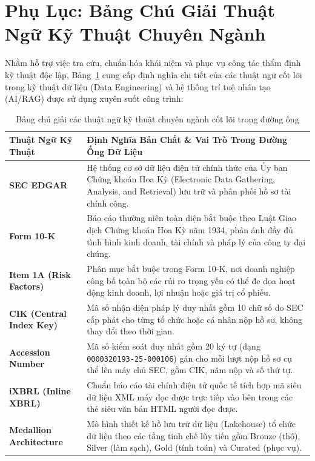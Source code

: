 \section*{Phụ Lục: Bảng Chú Giải Thuật Ngữ Kỹ Thuật Chuyên Ngành}

Nhằm hỗ trợ việc tra cứu, chuẩn hóa khái niệm và phục vụ công tác thẩm định kỹ thuật độc lập, Bảng~\ref{tab:glossary_technical_terms} cung cấp định nghĩa chi tiết của các thuật ngữ cốt lõi trong kỹ thuật dữ liệu (Data Engineering) và hệ thống trí tuệ nhân tạo (AI/RAG) được sử dụng xuyên suốt công trình:

\begin{table}[htbp]
\centering
\scriptsize
\setlength{\tabcolsep}{3pt}
\caption{Bảng chú giải các thuật ngữ kỹ thuật chuyên ngành cốt lõi trong đường ống}
\label{tab:glossary_technical_terms}
\begin{tabularx}{\textwidth}{p{3.8cm} X}
\toprule
\textbf{Thuật Ngữ Kỹ Thuật} & \textbf{Định Nghĩa Bản Chất \& Vai Trò Trong Đường Ống Dữ Liệu} \\
\midrule
\textbf{SEC EDGAR} & Hệ thống cơ sở dữ liệu điện tử chính thức của Ủy ban Chứng khoán Hoa Kỳ (Electronic Data Gathering, Analysis, and Retrieval) lưu trữ và phân phối hồ sơ tài chính công. \\
\textbf{Form 10-K} & Báo cáo thường niên toàn diện bắt buộc theo Luật Giao dịch Chứng khoán Hoa Kỳ năm 1934, phản ánh đầy đủ tình hình kinh doanh, tài chính và pháp lý của công ty đại chúng. \\
\textbf{Item 1A (Risk Factors)} & Phân mục bắt buộc trong Form 10-K, nơi doanh nghiệp công bố toàn bộ các rủi ro trọng yếu có thể đe dọa hoạt động kinh doanh, lợi nhuận hoặc giá trị cổ phiếu. \\
\textbf{CIK (Central Index Key)} & Mã số nhận diện pháp lý duy nhất gồm 10 chữ số do SEC cấp phát cho từng tổ chức hoặc cá nhân nộp hồ sơ, không thay đổi theo thời gian. \\
\textbf{Accession Number} & Mã số kiểm soát duy nhất gồm 20 ký tự (dạng \texttt{0000320193-25-000106}) gán cho mỗi lượt nộp hồ sơ cụ thể lên máy chủ SEC, gồm CIK, năm nộp và số thứ tự. \\
\textbf{iXBRL (Inline XBRL)} & Chuẩn báo cáo tài chính điện tử quốc tế tích hợp mã siêu dữ liệu XML máy đọc được trực tiếp vào bên trong các thẻ siêu văn bản HTML người đọc được. \\
\textbf{Medallion Architecture} & Mô hình thiết kế hồ lưu trữ dữ liệu (Lakehouse) tổ chức dữ liệu theo các tầng tinh chế lũy tiến gồm Bronze (thô), Silver (làm sạch), Gold (tính toán) và Curated (phục vụ). \\

\end{tabularx}
\end{table}
